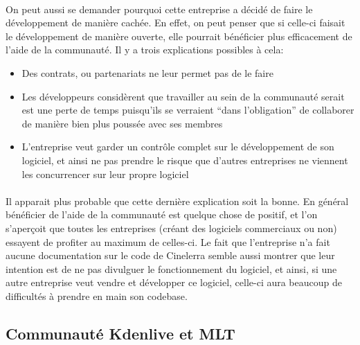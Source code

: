 \paragraph{}

On peut aussi se demander pourquoi cette entreprise a décidé de faire
le développement de manière cachée. En effet, on peut penser que si
celle-ci faisait le développement de manière ouverte, elle pourrait
bénéficier plus efficacement de l'aide de la communauté. Il y a trois
explications possibles à cela:

\begin{itemize}

  \item {Des contrats, ou partenariats ne leur permet pas de le faire}

  \item {Les développeurs considèrent que travailler au sein de la
  communauté serait est une perte de temps puisqu'ils se verraient
  ``dans l'obligation'' de collaborer de manière bien plus poussée
  avec ses membres}

  \item {L'entreprise veut garder un contrôle complet sur le
    développement de son logiciel, et ainsi ne pas prendre le risque
    que d'autres entreprises ne viennent les concurrencer sur leur
    propre logiciel}

\end{itemize}

\paragraph{}

Il apparait plus probable que cette dernière explication soit la bonne.
En général bénéficier de l'aide de la communauté est quelque chose
de positif, et l'on s'aperçoit que toutes les entreprises (créant
des logiciels commerciaux ou non) essayent de profiter au maximum de
celles-ci. Le fait que l'entreprise n'a fait aucune documentation sur
le code de Cinelerra semble aussi montrer que leur intention est de
ne pas divulguer le fonctionnement du logiciel, et ainsi, si une autre
entreprise veut vendre et développer ce logiciel, celle-ci aura beaucoup
de difficultés à prendre en main son codebase.

\subsection {Communauté Kdenlive et MLT}

